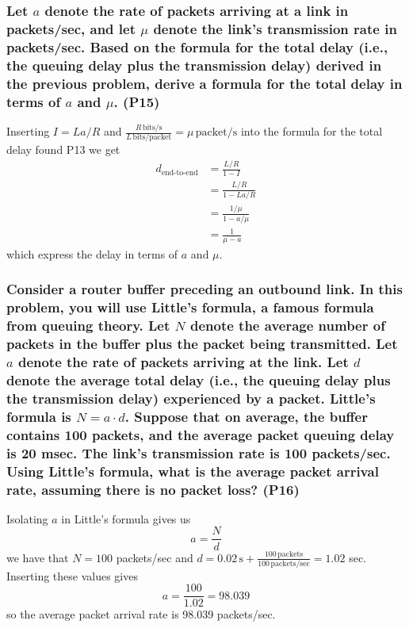 \subsubsection{Let $a$ denote the rate of packets arriving at a link in packets/sec, and let $\mu$ denote the link's transmission rate in packets/sec. Based on the formula for the total delay (i.e., the queuing delay plus the transmission delay) derived in the previous problem, derive a formula for the total delay in terms of $a$ and $\mu$. (P15)}
Inserting $I = La/R$ and $\frac{R \, \text{bits/s}}{L \, \text{bits/packet}}= \mu \, \text{packet/s}$ into the formula for the total delay found P13 we get
\begin{equation*}
\begin{split}
    d_{\text{end-to-end}} &= \frac{L/R}{1 - I} \\
    &= \frac{L/R}{1 - La/R} \\
    &= \frac{1/\mu}{1 - a/\mu} \\
    &= \frac{1}{\mu - a}
\end{split}
\end{equation*}
which express the delay in terms of $a$ and $\mu$.

\subsubsection{Consider a router buffer preceding an outbound link. In this problem, you will use Little's formula, a famous formula from queuing theory. Let $N$ denote the average number of packets in the buffer plus the packet being transmitted. Let $a$ denote the rate of packets arriving at the link. Let $d$ denote the average total delay (i.e., the queuing delay plus the transmission delay) experienced by a packet. Little's formula is $N=a \cdot d$. Suppose that on  average, the buffer contains 100 packets, and the average packet queuing delay is 20 msec. The link's transmission rate is 100 packets/sec. Using  Little's formula, what is the average packet arrival rate, assuming there is  no packet loss? (P16)}

Isolating $a$ in Little's formula gives us
\begin{equation*}
    a = \frac{N}{d} 
\end{equation*}
we have that $N = 100$ packets/sec and $d = 0.02 \, \text{s}+ \frac{100 \, \text{packets}}{100 \, \text{packets/sec}} = 1.02$ sec. Inserting these values gives
\begin{equation*}
    a = \frac{100}{1.02} = 98.039
\end{equation*}
so the average packet arrival rate is 98.039 packets/sec.

